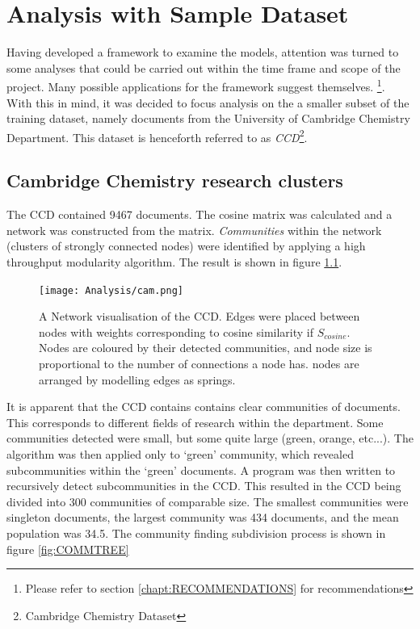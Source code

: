 \chapter{Analysis with Sample Dataset}
Having developed a framework to examine the models, attention was turned to some analyses that could be carried out within the time frame and scope of the project. Many possible applications for the framework suggest themselves. \footnote{Please refer to section \ref{chapt:RECOMMENDATIONS} for recommendations}. With this in mind, it was decided to focus analysis on the a smaller subset of the training dataset, namely documents from the University of Cambridge Chemistry Department. This dataset is henceforth referred to as \emph{CCD}\footnote{Cambridge Chemistry Dataset}.
\section{Cambridge Chemistry research clusters}
\label{sec:RESEARCHCLUSTERS}
The CCD contained 9467 documents. The cosine matrix was calculated and a network was constructed from the matrix. \emph{Communities} within the network (clusters of strongly connected nodes) were identified by applying a high throughput modularity algorithm\cite{modularity1}\cite{modularity2}. The result is shown in figure \ref{fig:CAMCOMMUNITIES}.
\begin{center}
\begin{figure}[H]
\label{fig:CAMCOMMUNITIES}
  \centering
    \texttt{[image: Analysis/cam.png]}
    \caption{A Network visualisation of the CCD. Edges were placed between nodes with weights corresponding to cosine similarity if $S_{cosine}$. Nodes are coloured by their detected communities, and node size is proportional to the number of connections a node has. nodes are arranged by modelling edges as springs.}
\end{figure} 
\end{center}
It is apparent that the CCD contains contains clear communities of documents. This corresponds to different fields of research within the department. Some communities detected were small, but some quite large (green, orange, etc...). The algorithm was then applied only to `green' community, which revealed subcommunities within the `green' documents. A program was then written to recursively detect subcommunities in the CCD. This resulted in the CCD being divided into 300 communities of comparable size. The smallest communities were singleton documents, the largest community was 434 documents, and the mean population was 34.5. The community finding subdivision process is shown in figure \ref{fig:COMMTREE}

